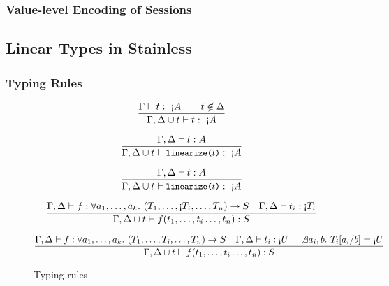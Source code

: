 \documentclass[a4paper,twoside]{article}
\newcommand{\stt}[1]{\texttt{\small{#1}}}
\begin{document}
\subsubsection{Value-level Encoding of Sessions}

\subsection{Linear Types in Stainless}

\subsubsection{Typing Rules}

\newcommand{\lin}[1]{\text{\textexclamdown} #1}

\begin{figure}[htb]
\begin{framed}
 
\begin{equation}
\dfrac{
  \Gamma \vdash t :\ \lin{A} \qquad t \not\in \Delta
}{
  \Gamma, \Delta \cup t \vdash t :\ \lin{A}
}
\end{equation}

\begin{equation}
\dfrac{
  \Gamma, \Delta \vdash t : A
}{
  \Gamma, \Delta \cup t \vdash \stt{linearize($t$)} :\ \lin{A}
}
\end{equation}

\begin{equation}
\dfrac{
  \Gamma, \Delta \vdash t : A
}{
  \Gamma, \Delta \cup t \vdash \stt{linearize($t$)} :\ \lin{A}
}
\end{equation}


\begin{equation}
\dfrac{
  \Gamma, \Delta \vdash f : \forall a_1, \ldots, a_k.\ (T_1, \ldots, \lin{T_i}, \ldots, T_n) \to S
  \quad
  \Gamma, \Delta \vdash t_i : \lin{T_i}
}{
  \Gamma, \Delta \cup t \vdash f(t_1, \ldots, t_i \ldots, t_n) : S
}
\end{equation}

\begin{equation}
\dfrac{
  \Gamma, \Delta \vdash f : \forall a_1, \ldots, a_k.\ (T_1, \ldots, T_i, \ldots, T_n) \to S
  \quad
  \Gamma, \Delta \vdash t_i : \lin{U}
  \quad
  \not\exists a_i, b.\ T_i[a_i/b] = \lin{U}
}{
  \Gamma, \Delta \cup t \vdash f(t_1, \ldots, t_i \ldots, t_n) : S
}
\end{equation}

\end{framed}
\vspace{-10pt}
\caption{Typing rules \label{fig:lintypesrules}}
\end{figure}
\end{document}
